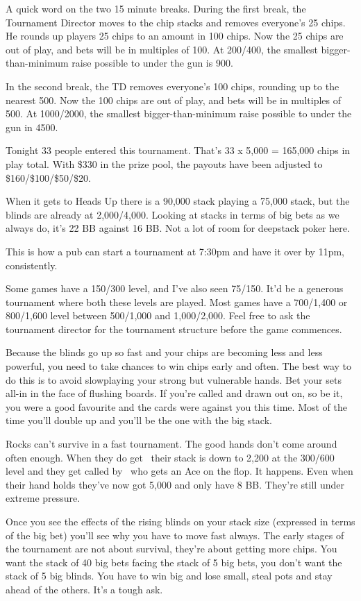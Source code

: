 A quick word on the two 15 minute breaks. During the first break,
the Tournament Director moves to the chip stacks and removes
everyone's 25 chips. He rounds up players 25 chips to an amount
in 100 chips. Now the 25 chips are out of play, and bets will be
in multiples of 100. At 200/400, the smallest bigger-than-minimum
raise possible to under the gun is 900.

In the second break, the TD removes everyone's 100 chips, rounding up
to the nearest 500. Now the 100 chips are out of play, and bets
will be in multiples of 500. At 1000/2000, the smallest
bigger-than-minimum raise possible to under the gun in 4500.

Tonight 33 people entered this tournament. That's 33 x 5,000 = 165,000
chips in play total. With \$330 in the prize pool, the payouts have been
adjusted to \$160/\$100/\$50/\$20.

When it gets to Heads Up there is a 90,000 stack
playing a 75,000 stack, but the blinds are already at 2,000/4,000.
Looking at stacks in terms of big bets as we always do,
it's 22 BB against 16 BB. Not a lot of room for deepstack
poker here.

This is how a pub can start a tournament at 7:30pm and have it over
by 11pm, consistently.

Some games have a 150/300 level, and I've also seen 75/150. It'd be
a generous tournament where both these levels are played. Most games
have a 700/1,400 or 800/1,600 level between 500/1,000 and 1,000/2,000. Feel
free to ask the tournament director for the tournament structure before
the game commences.

Because the blinds go up so fast and your chips are becoming less and
less powerful, you need to take chances to win chips early and often.
The best way to do this is to avoid slowplaying your strong but
vulnerable hands. Bet your sets all-in in the face of flushing boards.
If you're called and drawn out on, so be it, you were a good favourite
and the cards were against you this time. Most of the time you'll double
up and you'll be the one with the big stack.

Rocks can't survive in a fast tournament. The good hands don't come
around often enough. When they do get \Kh\Kc\ their stack is down to 2,200 at
the 300/600 level and they get called by \As\Qs\ who gets an Ace on the flop.
It happens. Even when their hand holds they've now got 5,000 and only have
8 BB. They're still under extreme pressure.

Once you see the effects of the rising blinds on your stack size
(expressed in terms of the big bet) you'll see why you have to move
fast always. The early stages of the tournament are not about survival,
they're about getting more chips. You want the stack of 40 big bets facing
the stack of 5 big bets, you don't want the stack of 5 big blinds. You
have to win big and lose small, steal pots and stay ahead of the others.
It's a tough ask.

